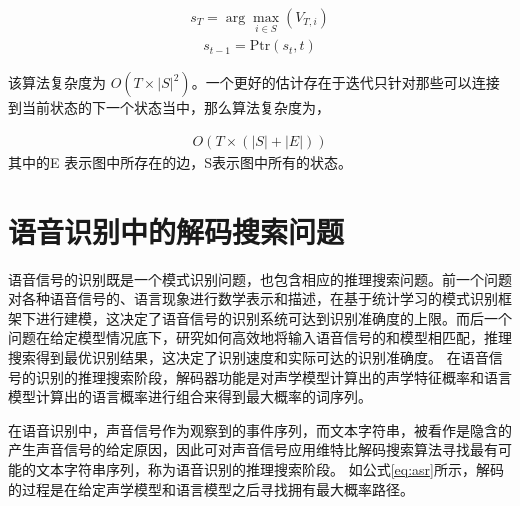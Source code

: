 \begin{equation}
\begin{split}
s_{T}=\arg \max _{i\in S}(V_{T,i})
\end{split}
\end{equation}
\begin{equation}
\begin{split}
s_{t-1}=\mathrm {Ptr} (s_{t},t)
\end{split}
\end{equation}

该算法复杂度为 $O(T\times \left|{S}\right|^{2})$。一个更好的估计存在于迭代只针对那些可以连接到当前状态的下一个状态当中，那么算法复杂度为，

\begin{equation}
\begin{split}
\label{equ:viterbi-cmp}
O(T\times (\left|{S}\right|+\left|{E}\right|))
\end{split}
\end{equation}
 其中的E 表示图中所存在的边，S表示图中所有的状态。

\section{语音识别中的解码搜索问题}
\label{sec:decode}

语音信号的识别既是一个模式识别问题，也包含相应的推理搜索问题。前一个问题对各种语音信号的、语言现象进行数学表示和描述，在基于统计学习的模式识别框架下进行建模，这决定了语音信号的识别系统可达到识别准确度的上限。而后一个问题在给定模型情况底下，研究如何高效地将输入语音信号的和模型相匹配，推理搜索得到最优识别结果，这决定了识别速度和实际可达的识别准确度。
在语音信号的识别的推理搜索阶段，解码器功能是对声学模型计算出的声学特征概率和语言模型计算出的语言概率进行组合来得到最大概率的词序列。

在语音识别中，声音信号作为观察到的事件序列，而文本字符串，被看作是隐含的产生声音信号的给定原因，因此可对声音信号应用维特比解码搜索算法寻找最有可能的文本字符串序列，称为语音识别的推理搜索阶段。
如公式\ref{eq:asr}所示，解码的过程是在给定声学模型和语言模型之后寻找拥有最大概率路径。

